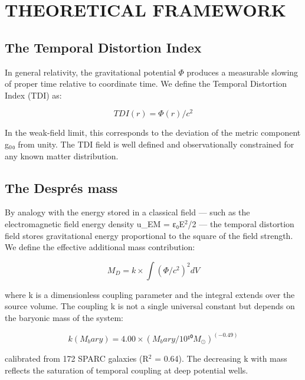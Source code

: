 \documentclass[a4paper,fleqn,usenatbib]{mnras}
\begin{document}
\section{THEORETICAL FRAMEWORK}\label{sec:2-theoretical-framework}


\subsection{The Temporal Distortion Index}\label{sec:2-1-the-temporal-distortion-index}

In general relativity, the gravitational potential $\Phi$ produces a measurable slowing of proper time relative to coordinate time. We define the Temporal Distortion Index (TDI) as:

\begin{equation}\label{eq:1}
  TDI(r) = \Phi(r) / c^{2}
\end{equation}

In the weak-field limit, this corresponds to the deviation of the metric component g$_0$₀ from unity. The TDI field is well defined and observationally constrained for any known matter distribution.


\subsection{The Després mass}\label{sec:2-2-the-despr-s-mass}

By analogy with the energy stored in a classical field — such as the electromagnetic field energy density u_EM = ε₀E$^{2}$/2 — the temporal distortion field stores gravitational energy proportional to the square of the field strength. We define the effective additional mass contribution:

\begin{equation}\label{eq:2}
  M_D = k \times ∫ (\Phi/c^{2})^{2} dV
\end{equation}

where k is a dimensionless coupling parameter and the integral extends over the source volume. The coupling k is not a single universal constant but depends on the baryonic mass of the system:

\begin{equation}\label{eq:3}
  k(M_bary) = 4.00 \times (M_bary / 10¹⁰ M_\odot)^(−0.49)
\end{equation}

calibrated from 172 SPARC galaxies (R$^{2}$ = 0.64). The decreasing k with mass reflects the saturation of temporal coupling at deep potential wells.
\end{document}
